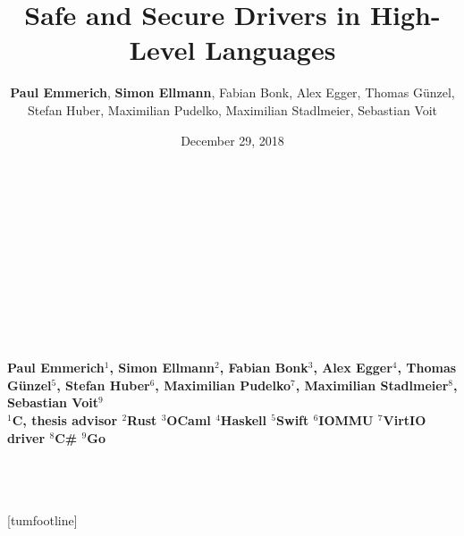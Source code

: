 \documentclass[NET,english,aspectratio=169,notitleframe]{tumbeamer}
\author[Paul Emmerich, Simon Ellmann]{\textbf{Paul Emmerich}, \textbf{Simon Ellmann}, Fabian Bonk, Alex Egger, Thomas Günzel,\\ Stefan Huber,  Maximilian Pudelko, Maximilian Stadlmeier, Sebastian Voit}
\title{Safe and Secure Drivers in High-Level Languages}
\date{December 29, 2018}
\begin{document}
  \begin{frame}[c,noframenumbering]
  \centering%
  \Large%
  \strut\textcolor{TUMBlue}{\inserttitle}%
  \\[4ex]%
  \normalsize%
  \strut\insertauthor%
  \\[2ex]%
  \footnotesize%
  \insertdate%
  \\[4ex]%
  \ifdefined\departmentname%
    \ifdefined\chairname%
      \chairname\\%
    \fi%
    \departmentname\\%
  \fi%
  \TUMname\\%
\end{frame}

  \begin{frame}[c,noframenumbering]
  \centering%
  \Large%
  \strut\textcolor{TUMBlue}{\inserttitle}%
  \\[4ex]%
  \normalsize%
  \strut{}\bfseries Paul Emmerich$^1$, Simon Ellmann$^2$, Fabian Bonk$^3$, Alex Egger$^4$, Thomas Günzel$^5$, Stefan Huber$^6$,  Maximilian Pudelko$^7$, Maximilian Stadlmeier$^8$, Sebastian Voit$^9$\normalfont %
  \\[2ex]%
  \footnotesize%
  $^1$C, thesis advisor\hspace{1em}
  $^2$Rust\hspace{1em}
  $^3$OCaml\hspace{1em}
  $^4$Haskell\hspace{1em}
  $^5$Swift\hspace{1em}
  $^6$IOMMU\hspace{1em}
  $^7$VirtIO driver\hspace{1em}
  $^8$C\#\hspace{1em}
  $^9$Go
  \\[4ex]%
    \ifdefined\departmentname%
    \ifdefined\chairname%
      \chairname\\%
    \fi%
    \departmentname\\%
  \fi%
  \TUMname\\%
\end{frame}
[tumfootline]
\end{document}
